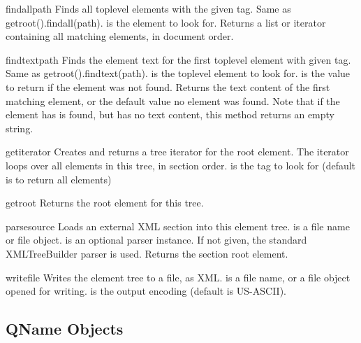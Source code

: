 \begin{methoddesc}{findall}{path}
Finds all toplevel elements with the given tag.
Same as getroot().findall(path).
 is the element to look for.
Returns a list or iterator containing all matching elements,
in document order.
\end{methoddesc}

\begin{methoddesc}{findtext}{path}
Finds the element text for the first toplevel element with given
tag.  Same as getroot().findtext(path).
 is the toplevel element to look for.
 is the value to return if the element was not found.
Returns the text content of the first matching element, or the
default value no element was found.  Note that if the element
has is found, but has no text content, this method returns an
empty string.
\end{methoddesc}

\begin{methoddesc}{getiterator}{}
Creates and returns a tree iterator for the root element.  The iterator loops
over all elements in this tree, in section order.
 is the tag to look for (default is to return all elements)
\end{methoddesc}

\begin{methoddesc}{getroot}{}
Returns the root element for this tree.
\end{methoddesc}

\begin{methoddesc}{parse}{source}
Loads an external XML section into this element tree.
 is a file name or file object.
 is an optional parser instance.  If not given, the
standard XMLTreeBuilder parser is used.
Returns the section root element.
\end{methoddesc}

\begin{methoddesc}{write}{file}
Writes the element tree to a file, as XML.
 is a file name, or a file object opened for writing.
 is the output encoding (default is US-ASCII).
\end{methoddesc}


\subsection{QName Objects\label{elementtree-qname-objects}}

